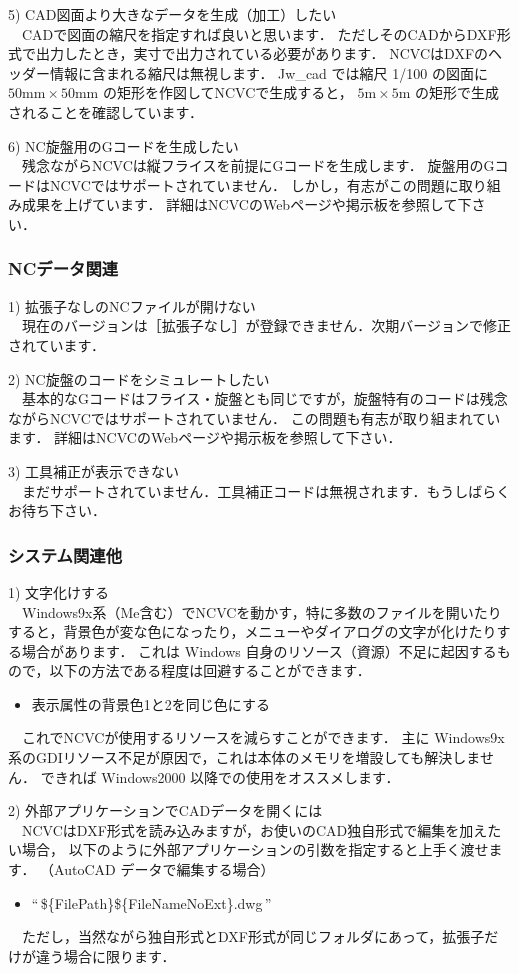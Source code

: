 \vspace*{1zh}
5) CAD図面より大きなデータを生成（加工）したい\\
　CADで図面の縮尺を指定すれば良いと思います．
ただしそのCADからDXF形式で出力したとき，実寸で出力されている必要があります．
NCVCはDXFのヘッダー情報に含まれる縮尺は無視します．
Jw\_cad では縮尺 1/100 の図面に $50\mathrm{mm}\times 50\mathrm{mm}$ の矩形を作図してNCVCで生成すると，
$5\mathrm{m}\times 5\mathrm{m}$ の矩形で生成されることを確認しています．

\vspace*{1zh}
6) NC旋盤用のGコードを生成したい\\
　残念ながらNCVCは縦フライスを前提にGコードを生成します．
旋盤用のGコードはNCVCではサポートされていません．
しかし，有志がこの問題に取り組み成果を上げています．
詳細はNCVCのWebページや掲示板を参照して下さい．

\subsubsection{NCデータ関連}

1) 拡張子なしのNCファイルが開けない\\
　現在のバージョンは［拡張子なし］が登録できません．次期バージョンで修正されています．

\vspace*{1zh}
2) NC旋盤のコードをシミュレートしたい\\
　基本的なGコードはフライス・旋盤とも同じですが，旋盤特有のコードは残念ながらNCVCではサポートされていません．
この問題も有志が取り組まれています．
詳細はNCVCのWebページや掲示板を参照して下さい．

\vspace*{1zh}
3) 工具補正が表示できない\\
　まだサポートされていません．工具補正コードは無視されます．もうしばらくお待ち下さい．

\subsubsection{システム関連他}

1) 文字化けする\\
　Windows9x系（Me含む）でNCVCを動かす，特に多数のファイルを開いたりすると，背景色が変な色になったり，メニューやダイアログの文字が化けたりする場合があります．
これは Windows 自身のリソース（資源）不足に起因するもので，以下の方法である程度は回避することができます．
\begin{itemize}
    \item 表示属性の背景色1と2を同じ色にする
\end{itemize}
　これでNCVCが使用するリソースを減らすことができます．
主に Windows9x 系のGDIリソース不足が原因で，これは本体のメモリを増設しても解決しません．
できれば Windows2000 以降での使用をオススメします．

\vspace*{1zh}
2) 外部アプリケーションでCADデータを開くには\\
　NCVCはDXF形式を読み込みますが，お使いのCAD独自形式で編集を加えたい場合，
以下のように外部アプリケーションの引数を指定すると上手く渡せます．
（AutoCAD データで編集する場合）
\begin{itemize}
    \item ``\,\$\{FilePath\}\$\{FileNameNoExt\}.dwg\,''
\end{itemize}
　ただし，当然ながら独自形式とDXF形式が同じフォルダにあって，拡張子だけが違う場合に限ります．
